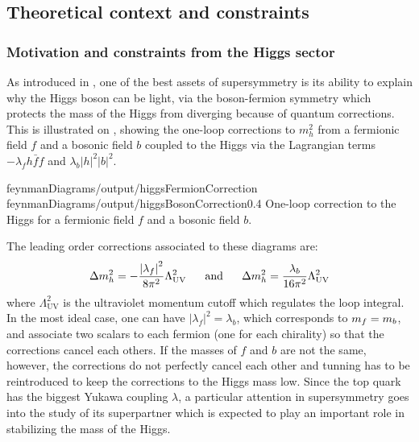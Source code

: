         \subsection{Theoretical context and constraints}

        \subsubsection{Motivation and constraints from the Higgs sector}

        As introduced in , one of the best assets of supersymmetry is its ability to explain why the Higgs
        boson can be light, via the boson-fermion symmetry which protects the mass
        of the Higgs from diverging because of quantum corrections. This is illustrated on
        , showing the one-loop corrections to $m_h^2$
        from a fermionic field $f$ and a bosonic field $b$ coupled to the Higgs via the
        Lagrangian terms $- \lambda_f h \bar{f} f$ and $\lambda_b \left| h \right|^2 \left| b \right|^2$.

        {feynmanDiagrams/output/higgsFermionCorrection}
        {feynmanDiagrams/output/higgsBosonCorrection}{0.4}
        {One-loop correction to the Higgs for a fermionic field $f$ and a bosonic field $b$.}

        The leading order corrections associated to these diagrams are:
        \begin{equation}
            \Delta m_{h}^2 = - \frac{\left| \lambda_f \right|^2}{8\pi^2} \Lambda^2_{\text{UV}}
            \, \, \, \, \, \, \, \, \, \, \text{and} \, \, \, \, \, \, \, \, \, \,
            \Delta m_{h}^2 =   \frac{\lambda_b}{16\pi^2} \Lambda^2_{\text{UV}}
        \end{equation}
        where $\Lambda^2_{\text{UV}}$ is the ultraviolet momentum cutoff which regulates
        the loop integral. In the most ideal case, one can have $\left| \lambda_f \right|^2
        = \lambda_b$, which corresponds to $m_{f} = m_{b}$, and associate two scalars
        to each fermion (one for each chirality) so that the corrections cancel each others.
        If the masses of $f$ and $b$ are not the same, however, the corrections do not
        perfectly cancel each other and tunning has to be reintroduced to keep the
        corrections to the Higgs mass low. Since the top quark has the biggest Yukawa coupling $\lambda$, a
        particular attention in supersymmetry goes into the study of its superpartner
        which is expected to play an important role in stabilizing the mass of the Higgs.

